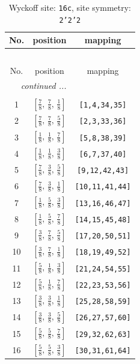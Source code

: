 \documentclass[fleqn,8pt]{jsarticle}
\begin{document}
\renewcommand{\arraystretch}{1.2}
\begin{longtable}{ccc}
\caption{Wyckoff site: {\tt 16c}, site symmetry: {\tt 2'2'2}}
 \\
 \hline \hline
No. & position & mapping \\ \hline \endfirsthead

\multicolumn{2}{l}{\tablename\ \thetable{}} \\
 \hline \hline
No. & position & mapping \\ \hline \endhead

 \hline \hline
\multicolumn{2}{r}{\footnotesize\it continued ...} \\ \endfoot

 \hline \hline
\multicolumn{2}{r}{} \\ \endlastfoot

1 & $\left[ \frac{7}{8},\, \frac{7}{8},\, \frac{1}{8} \right]$ & {\tt [1,4,34,35]} \\ \hline
2 & $\left[ \frac{7}{8},\, \frac{7}{8},\, \frac{5}{8} \right]$ & {\tt [2,3,33,36]} \\ \hline
3 & $\left[ \frac{1}{8},\, \frac{1}{8},\, \frac{7}{8} \right]$ & {\tt [5,8,38,39]} \\ \hline
4 & $\left[ \frac{1}{8},\, \frac{1}{8},\, \frac{3}{8} \right]$ & {\tt [6,7,37,40]} \\ \hline
5 & $\left[ \frac{7}{8},\, \frac{3}{8},\, \frac{5}{8} \right]$ & {\tt [9,12,42,43]} \\ \hline
6 & $\left[ \frac{7}{8},\, \frac{3}{8},\, \frac{1}{8} \right]$ & {\tt [10,11,41,44]} \\ \hline
7 & $\left[ \frac{1}{8},\, \frac{5}{8},\, \frac{3}{8} \right]$ & {\tt [13,16,46,47]} \\ \hline
8 & $\left[ \frac{1}{8},\, \frac{5}{8},\, \frac{7}{8} \right]$ & {\tt [14,15,45,48]} \\ \hline
9 & $\left[ \frac{3}{8},\, \frac{7}{8},\, \frac{5}{8} \right]$ & {\tt [17,20,50,51]} \\ \hline
10 & $\left[ \frac{3}{8},\, \frac{7}{8},\, \frac{1}{8} \right]$ & {\tt [18,19,49,52]} \\ \hline
11 & $\left[ \frac{5}{8},\, \frac{1}{8},\, \frac{3}{8} \right]$ & {\tt [21,24,54,55]} \\ \hline
12 & $\left[ \frac{5}{8},\, \frac{1}{8},\, \frac{7}{8} \right]$ & {\tt [22,23,53,56]} \\ \hline
13 & $\left[ \frac{3}{8},\, \frac{3}{8},\, \frac{1}{8} \right]$ & {\tt [25,28,58,59]} \\ \hline
14 & $\left[ \frac{3}{8},\, \frac{3}{8},\, \frac{5}{8} \right]$ & {\tt [26,27,57,60]} \\ \hline
15 & $\left[ \frac{5}{8},\, \frac{5}{8},\, \frac{7}{8} \right]$ & {\tt [29,32,62,63]} \\ \hline
16 & $\left[ \frac{5}{8},\, \frac{5}{8},\, \frac{3}{8} \right]$ & {\tt [30,31,61,64]} \\
\end{longtable}
\end{document}
